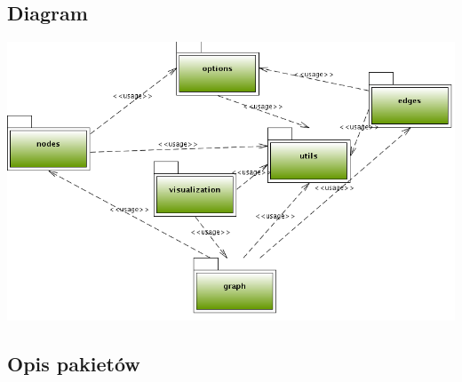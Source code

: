 \documentclass[a4paper,10pt]{article}
\begin{document}
\subsection{Diagram}
 \includegraphics[width=\linewidth]{./modelowanie/OV_UML/PackageDiagram.png}

\newpage
\subsection{Opis pakietów}
\end{document}
